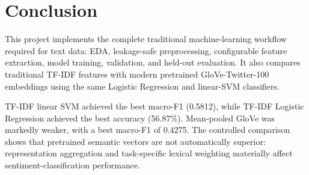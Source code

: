 \section{Conclusion}

This project implements the complete traditional machine-learning workflow required for text data: EDA, leakage-safe preprocessing, configurable feature extraction, model training, validation, and held-out evaluation. It also compares traditional TF-IDF features with modern pretrained GloVe-Twitter-100 embeddings using the same Logistic Regression and linear-SVM classifiers.

TF-IDF linear SVM achieved the best macro-F1 (0.5812), while TF-IDF Logistic Regression achieved the best accuracy (56.87\%). Mean-pooled GloVe was markedly weaker, with a best macro-F1 of 0.4275. The controlled comparison shows that pretrained semantic vectors are not automatically superior: representation aggregation and task-specific lexical weighting materially affect sentiment-classification performance.
